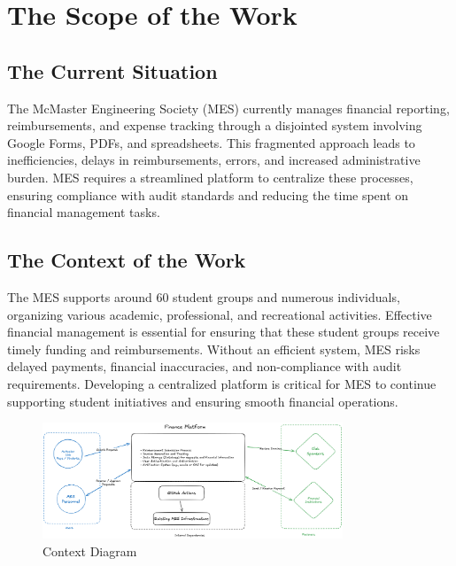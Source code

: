 \documentclass[12pt]{article}
\begin{document}
\section{The Scope of the Work}

\subsection{The Current Situation}
The McMaster Engineering Society (MES) currently manages financial reporting, reimbursements, and expense tracking through a disjointed system involving Google Forms, PDFs, and spreadsheets. This fragmented approach leads to inefficiencies, delays in reimbursements, errors, and increased administrative burden. MES requires a streamlined platform to centralize these processes, ensuring compliance with audit standards and reducing the time spent on financial management tasks.

\subsection{The Context of the Work}
The MES supports around 60 student groups and numerous individuals, organizing various academic, professional, and recreational activities. Effective financial management is essential for ensuring that these student groups receive timely funding and reimbursements. Without an efficient system, MES risks delayed payments, financial inaccuracies, and non-compliance with audit requirements. Developing a centralized platform is critical for MES to continue supporting student initiatives and ensuring smooth financial operations.

\begin{figure}[h!]
    \centering
    \includegraphics[width=0.8\textwidth]{./imgs/context-diagram.png}
    \caption{Context Diagram}
\end{figure}
\end{document}

